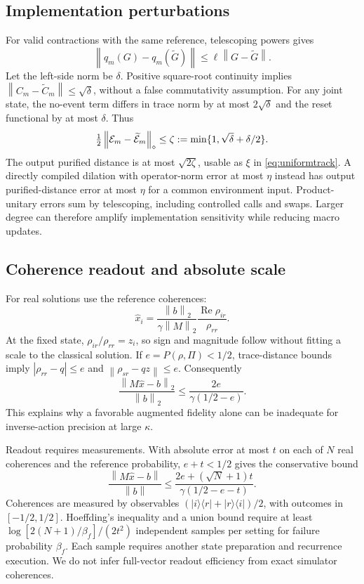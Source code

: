 \documentclass{ieeeaccess}
\newcommand{\norm}[1]{\left\lVert #1\right\rVert}
\newcommand{\ket}[1]{\lvert #1\rangle}\newcommand{\bra}[1]{\langle #1\rvert}
\begin{document}
\subsection{Implementation perturbations}
For valid contractions with the same reference, telescoping powers gives
\begin{equation}\label{eq:lip}
\norm{q_m(G)-q_m(\widetilde G)}\le\ell\norm{G-\widetilde G}.
\end{equation}
Let the left-side norm be $\delta$. Positive square-root continuity implies $\norm{C_m-\widetilde C_m}\le\sqrt\delta$, without a false commutativity assumption. For any joint state, the no-event term differs in trace norm by at most $2\sqrt\delta$ and the reset functional by at most $\delta$. Thus
\begin{equation}\label{eq:diamond}
\tfrac12\norm{\E_m-\widetilde\E_m}_{\diamond}\le\zeta:=\min\{1,\sqrt\delta+\delta/2\}.
\end{equation}
The output purified distance is at most $\sqrt{2\zeta}$, usable as $\xi$ in \eqref{eq:uniformtrack}. A directly compiled dilation with operator-norm error at most $\eta$ instead has output purified-distance error at most $\eta$ for a common environment input. Product-unitary errors sum by telescoping, including controlled calls and swaps. Larger degree can therefore amplify implementation sensitivity while reducing macro updates.

\subsection{Coherence readout and absolute scale}
For real solutions use the reference coherences:
\begin{equation}\label{eq:readout}
\widehat x_i=\frac{\norm b_2}{\gamma\norm M_2}
\frac{\operatorname{Re}\rho_{ir}}{\rho_{rr}}.
\end{equation}
At the fixed state, $\rho_{ir}/\rho_{rr}=z_i$, so sign and magnitude follow without fitting a scale to the classical solution. If $e=P(\rho,\Pi)<1/2$, trace-distance bounds imply $|\rho_{rr}-q|\le e$ and $\norm{\rho_{sr}-qz}\le e$. Consequently
\begin{equation}\label{eq:resread}
\frac{\norm{M\widehat x-b}_2}{\norm b_2}\le\frac{2e}{\gamma(1/2-e)}.
\end{equation}
This explains why a favorable augmented fidelity alone can be inadequate for inverse-action precision at large $\kappa$.

Readout requires measurements. With absolute error at most $t$ on each of $N$ real coherences and the reference probability, $e+t<1/2$ gives the conservative bound
\begin{equation}\label{eq:shots}
\frac{\norm{M\widehat x-b}}{\norm b}\le
\frac{2e+(\sqrt N+1)t}{\gamma(1/2-e-t)}.
\end{equation}
Coherences are measured by observables $(\ket i\bra r+\ket r\bra i)/2$, with outcomes in $[-1/2,1/2]$. Hoeffding's inequality and a union bound require at least $\log[2(N+1)/\beta_f]/(2t^2)$ independent samples per setting for failure probability $\beta_f$. Each sample requires another state preparation and recurrence execution. We do not infer full-vector readout efficiency from exact simulator coherences.
\end{document}
